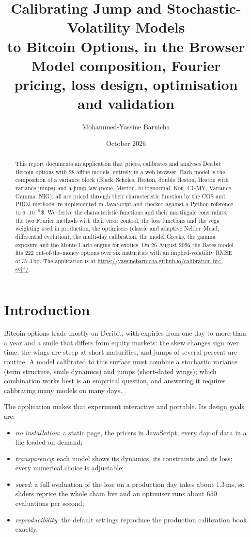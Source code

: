 \documentclass[11pt,a4paper]{article}
\title{Calibrating Jump and Stochastic-Volatility Models\\to Bitcoin Options, in the Browser\\[4pt]
  \large Model composition, Fourier pricing, loss design, optimisation and validation}
\author{Mohammed-Yassine Barnicha}
\date{October 2026}
\theoremstyle{definition}
\theoremstyle{remark}
\begin{document}
\maketitle

\begin{abstract}
\noindent This report documents an application that prices, calibrates and analyses Deribit Bitcoin options with 28
affine models, entirely in a web browser. Each model is the composition of a variance block (Black--Scholes, Heston, double
Heston, Heston with variance jumps) and a jump law (none, Merton, bi-lognormal, Kou, CGMY, Variance Gamma, NIG); all are
priced through their characteristic function by the COS and PROJ methods, re-implemented in JavaScript and checked against
a Python reference to $6\cdot10^{-6}$\,\$. We derive the characteristic functions and their martingale constraints, the two
Fourier methods with their error control, the loss functions and the vega weighting used in production, the optimisers (classic
and adaptive Nelder--Mead, differential evolution), the multi-day calibration, the model Greeks, the gamma exposure and the
Monte Carlo engine for exotics. On 26 August 2026 the Bates model fits 222 out-of-the-money options over six maturities with
an implied-volatility RMSE of $37.3$\,bp. The application is at \url{https://yassinebarnicha.github.io/calibration-btc-svjd/}.
\end{abstract}

\tableofcontents

\section{Introduction}
Bitcoin options trade mostly on Deribit, with expiries from one day to more than a year and a smile that differs from equity
markets: the skew changes sign over time, the wings are steep at short maturities, and jumps of several percent are routine.
A model calibrated to this surface must combine a stochastic variance (term structure, smile dynamics) and jumps (short-dated
wings); which combination works best is an empirical question, and answering it requires calibrating many models on many days.

The application makes that experiment interactive and portable. Its design goals are:
\begin{itemize}[nosep]
  \item \emph{no installation}: a static page, the pricers in JavaScript, every day of data in a file loaded on demand;
  \item \emph{transparency}: each model shows its dynamics, its constraints and its loss; every numerical choice is adjustable;
  \item \emph{speed}: a full evaluation of the loss on a production day takes about $1.3$\,ms, so sliders reprice the whole chain
        live and an optimiser runs about $650$ evaluations per second;
  \item \emph{reproducibility}: the default settings reproduce the production calibration book exactly.
\end{itemize}
\end{document}
